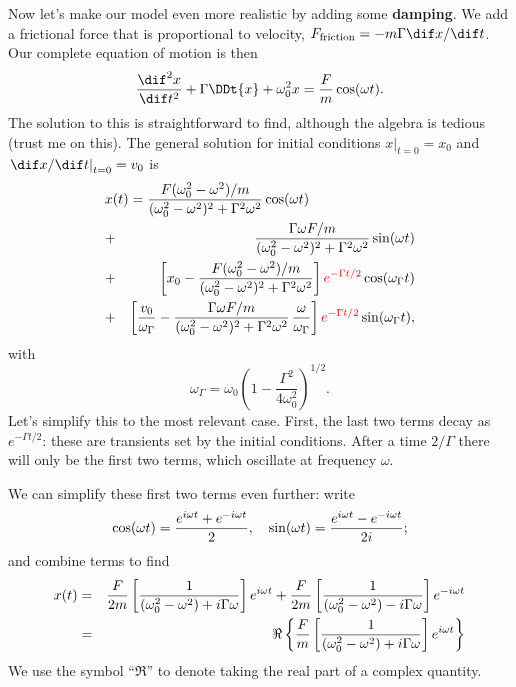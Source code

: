 Now let's make our model even more realistic by adding some \textbf{damping}.  We add a frictional force that is proportional to velocity, $F_{\mathrm{friction}} = -m\Gamma \dif x/\dif t$. Our complete equation of motion is then
\begin{equation}
	\DDtt{x} + \Gamma \DDt{x} + \omega_{0}^{2}x = \frac{F}{m}\cos(\omega t).
\end{equation}
The solution to this is straightforward to find, although the algebra is tedious (trust me on this). The general solution for initial conditions $\left.x\right|_{t=0} = x_{0}$ and $\left.\dif x/\dif t\right|_{t=0} = v_{0}$ is
\begin{eqnarray}
\label{e.general-solution-ddo}
\lefteqn{x(t) = \frac{F\womw/m}{\womw^{2}+\gw}\cos(\omega t)} && \\
	&+& \frac{\Gamma\omega F/m}{\womw^{2}+\gw}\sin(\omega t)\nonumber \\
	&+& \left[x_{0}-\frac{F\womw/m}{\womw^{2}+\gw}\right]{\color{red}e^{-\Gamma t/2}} \cos(\omega_{\Gamma}t) \nonumber\\
	&+& \left[\frac{v_{0}}{\omega_{\Gamma}}-\frac{\Gamma\omega F/m}{\womw^{2}+\gw}
	\,\frac{\omega}{\omega_{\Gamma}}\right]{\color{red}e^{-\Gamma t/2}} \sin(\omega_{\Gamma}t), 
	\nonumber
\end{eqnarray}
with
\[ 
    \omega_{\Gamma} = 
        \omega_{0}\left(1-\frac{\Gamma^{2}}{4\omega_{0}^{2}}\right)^{1/2}.
\]
Let's simplify this to the most relevant case.  First, the last two terms decay as {\color{red}$e^{-\Gamma t/2}$}: these are transients set by the initial conditions. After a time $2/\Gamma$ there will only be the first two terms, which oscillate at frequency $\omega$. 

We can simplify these first two terms even further: write
\[ \cos(\omega t) = \frac{e^{i\omega t}+e^{-i\omega t}}{2},\quad \sin(\omega t) 
    = \frac{e^{i\omega t}-e^{-i\omega t}}{2i}; \]
and combine terms to find
\begin{eqnarray}
    x(t) &=& \frac{F}{2m}\left[\frac{1}{\left(\omega_0^2-\omega^2\right) + i\Gamma\omega}\right]e^{i\omega t} + \frac{F}{2m}\left[\frac{1}{\left(\omega_0^2-\omega^2\right) - i\Gamma\omega}\right]e^{-i\omega t} \nonumber\\
    &=& \Re\left\{\frac{F}{m}\left[\frac{1}{\left(\omega_0^2-\omega^2\right) + i\Gamma\omega}\right]e^{i\omega t}\right\}\label{e.oscillator-expression}
\end{eqnarray}
We use the symbol ``$\Re$'' to denote taking the real part of a complex quantity.  

